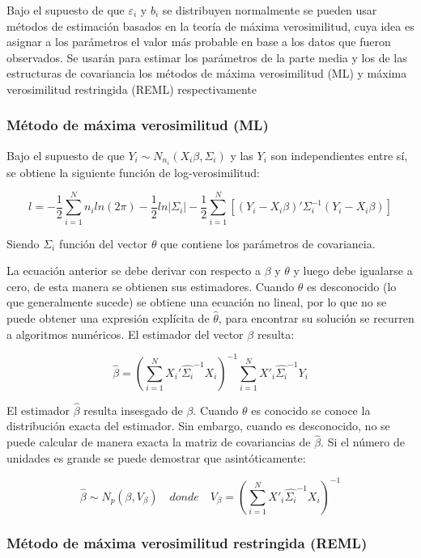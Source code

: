 \documentclass[spanish]{article}
\numberwithin{figure}{subsection}
\numberwithin{equation}{subsection}
\numberwithin{table}{subsection}
\begin{document}
Bajo el supuesto de que $\varepsilon_i$ y $b_i$ se distribuyen normalmente se
pueden usar métodos de estimación basados en la teoría de máxima verosimilitud,
cuya idea es asignar a los parámetros el valor más probable en base a los datos
que fueron observados. Se usarán para estimar los parámetros de la parte media
y los de las estructuras de covariancia los métodos de máxima verosimilitud
(ML) y máxima verosimilitud restringida (REML) respectivamente

\subsubsection{Método de máxima verosimilitud (ML)}

Bajo el supuesto de que $Y_i \sim N_{n_i}(X_i\beta, \varSigma_i)$ y las $Y_i$
son independientes entre sí, se obtiene la siguiente función de
log-verosimilitud:

\begin{equation}
\label{ML}
	l = -\frac{1}{2} \sum_{i=1}^{N}n_i ln(2\pi) - \frac{1}{2}ln|\varSigma_i| -
	\frac{1}{2} \sum_{i=1}^{N} [(Y_i - X_i\beta)'
	\varSigma_i^{-1} (Y_i - X_i\beta)]
\end{equation}

Siendo $\varSigma_i$ función del vector $\theta$ que contiene los parámetros de
covariancia.

La ecuación anterior se debe derivar con respecto a $\beta$ y $\theta$ y luego
debe igualarse a cero, de esta manera se obtienen sus estimadores. Cuando
$\theta$ es desconocido (lo que generalmente sucede) se obtiene una ecuación no
lineal, por lo que no se puede obtener una expresión explícita de
$\hat{\theta}$, para encontrar su solución se recurren a algoritmos numéricos.
El estimador del vector $\beta$ resulta:

\[ \hat{\beta} = (\sum_{i=1}^{N} X_i'\hat{\varSigma_i}^{-1}X_i)^{-1}
\sum_{i=1}^{N} X'_i\hat{\varSigma_i}^{-1}Y_i \]

El estimador $\hat{\beta}$ resulta insesgado de $\beta$. Cuando $\theta$ es
conocido se conoce la distribución exacta del estimador. Sin embargo, cuando es
desconocido, no se puede calcular de manera exacta la matriz de covariancias de
$\hat{\beta}$. Si el número de unidades es grande se puede demostrar que
asintóticamente:

\[ \hat{\beta} \sim N_p(\beta, V_{\beta}) \quad donde \quad V_{\beta} =
(\sum_{i=1}^{N} X'_i\hat{\varSigma_i}^{-1}X_i)^{-1} \]

\subsubsection{Método de máxima verosimilitud restringida (REML)}
\end{document}
